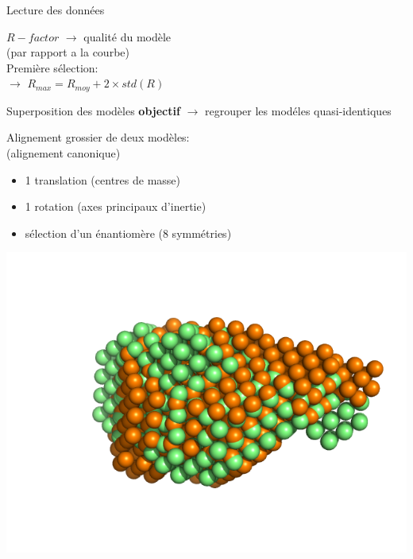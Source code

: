 \documentclass{beamer}
\begin{document}
\begin{frame}{Lecture des donn\'ees}
\begin{minipage}{0.50\linewidth}
\vspace{0.2cm}

$R-factor$ $\longrightarrow$ qualit\'e du mod\`ele\\
(par rapport a la courbe)\\

Premi\`ere s\'election:\\
$\longrightarrow$ $R_{max} = R_{moy} + 2 \times std(R)$
\end{minipage}
\end{frame}

\begin{frame}{Superposition des mod\`eles}
\textbf{objectif} $\longrightarrow$ regrouper les mod\'eles quasi-identiques

\vspace{0.2cm}
\begin{minipage}{0.70\linewidth}
Alignement grossier de deux mod\`eles:\\ 
(alignement canonique)
\begin{itemize}
\item 1 translation (centres de masse)
\item 1 rotation (axes principaux d'inertie)
\item s\'election d'un \'enantiom\`ere (8 symm\'etries)
\end{itemize}

\includegraphics[scale=0.30]{coarsealign.png}


\end{minipage}
\end{frame}
\end{document}
